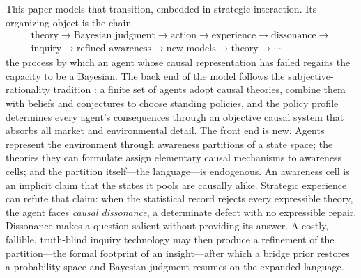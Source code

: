 \documentclass[11pt]{article}
\theoremstyle{definition}
\begin{document}
This paper models that transition, embedded in strategic interaction.
Its organizing object is the chain
\begin{align*}
	\text{theory}
	\longrightarrow
	\text{Bayesian judgment}
	\longrightarrow
	\text{action}
	\longrightarrow
	\text{experience}
	\longrightarrow
	\text{dissonance}
	\longrightarrow\\
	\text{inquiry}
	\longrightarrow
	\text{refined awareness}
	\longrightarrow
	\text{new models}
	\longrightarrow
	\text{theory}
	\longrightarrow \cdots
\end{align*}
the process by which an agent whose causal representation has failed regains the capacity to be a Bayesian.
The back end of the model follows the subjective-rationality tradition \citep{KalaiLehrer1993b,Ryall2003}: a finite set of agents adopt causal theories, combine them with beliefs and conjectures to choose standing policies, and the policy profile determines every agent's consequences through an objective causal system that absorbs all market and environmental detail.
The front end is new.
Agents represent the environment through awareness partitions of a state space; the theories they can formulate assign elementary causal mechanisms to awareness cells; and the partition itself---the language---is endogenous.
An awareness cell is an implicit claim that the states it pools are causally alike.
Strategic experience can refute that claim: when the statistical record rejects every expressible theory, the agent faces \emph{causal dissonance}, a determinate defect with no expressible repair.
Dissonance makes a question salient without providing its answer.
A costly, fallible, truth-blind inquiry technology may then produce a refinement of the partition---the formal footprint of an insight---after which a bridge prior restores a probability space and Bayesian judgment resumes on the expanded language.
\end{document}
